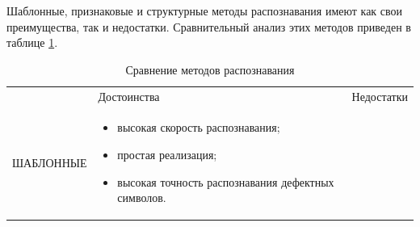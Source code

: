 Шаблонные, признаковые и структурные методы распознавания имеют как свои
преимущества, так и недостатки. Сравнительный анализ этих методов приведен в
таблице \ref{intro_table_review}.
\begin{table}[]
\caption{Сравнение методов распознавания}
\label{intro_table_review}
\fontsize{12pt}{14pt}\selectfont
\begin{tabularx}{\linewidth}{|c |X| X|}
\hhline{|---|}
\centering {Методы} & \centering Достоинства & \centering Недостатки \tabularnewline
\hhline{|---|}
ШАБЛОННЫЕ   &   \begin{itemize}[leftmargin=*,nosep]
 \item высокая скорость распознавания;
 \item простая реализация;
 \item высокая точность распознавания дефектных символов.
\end{itemize} 


\end{tabularx}
\end{table}
